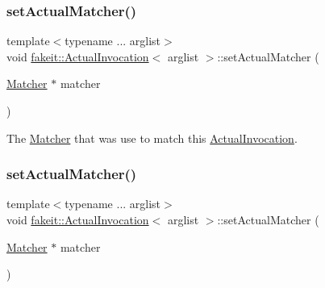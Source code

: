 \subsubsection{\texorpdfstring{setActualMatcher()}{setActualMatcher()}\hspace{0.1cm}{\footnotesize\ttfamily [1/9]}}
{\footnotesize\ttfamily template$<$typename ... arglist$>$ \\
void \mbox{\hyperlink{structfakeit_1_1ActualInvocation}{fakeit\+::\+Actual\+Invocation}}$<$ arglist $>$\+::set\+Actual\+Matcher (\begin{DoxyParamCaption}\item[{\mbox{\hyperlink{structfakeit_1_1ActualInvocation_1_1Matcher}{Matcher}} $\ast$}]{matcher }\end{DoxyParamCaption})\hspace{0.3cm}{\ttfamily [inline]}}



The \mbox{\hyperlink{structfakeit_1_1ActualInvocation_1_1Matcher}{Matcher}} that was use to match this \mbox{\hyperlink{structfakeit_1_1ActualInvocation}{Actual\+Invocation}}. 

\mbox{\label{structfakeit_1_1ActualInvocation_abc95cd40eee8560cfcc69f0ab1c23713}} 
\subsubsection{\texorpdfstring{setActualMatcher()}{setActualMatcher()}\hspace{0.1cm}{\footnotesize\ttfamily [2/9]}}
{\footnotesize\ttfamily template$<$typename ... arglist$>$ \\
void \mbox{\hyperlink{structfakeit_1_1ActualInvocation}{fakeit\+::\+Actual\+Invocation}}$<$ arglist $>$\+::set\+Actual\+Matcher (\begin{DoxyParamCaption}\item[{\mbox{\hyperlink{structfakeit_1_1ActualInvocation_1_1Matcher}{Matcher}} $\ast$}]{matcher }\end{DoxyParamCaption})\hspace{0.3cm}{\ttfamily [inline]}}

\mbox{\label{structfakeit_1_1ActualInvocation_abc95cd40eee8560cfcc69f0ab1c23713}} 
